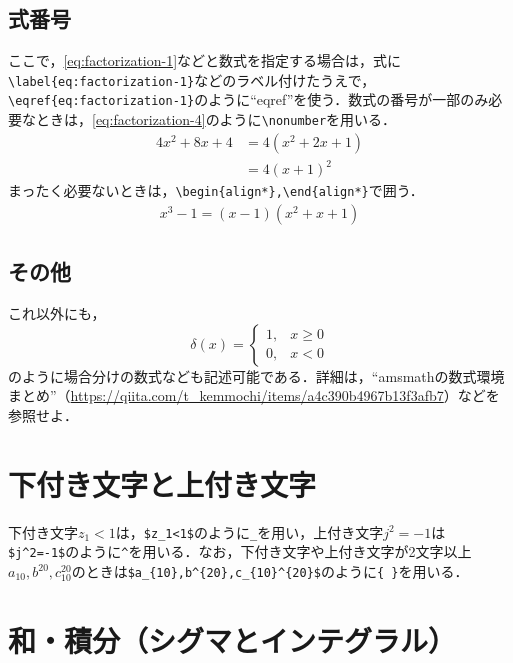 \documentclass[11pt,a4paper]{jsarticle}
\begin{document}
\subsection{式番号}

ここで，\eqref{eq:factorization-1}などと数式を指定する場合は，式に\verb|\label{eq:factorization-1}|などのラベル付けたうえで，\verb|\eqref{eq:factorization-1}|のように``eqref''を使う．数式の番号が一部のみ必要なときは，\eqref{eq:factorization-4}のように\verb|\nonumber|を用いる．
\begin{align}\label{eq:factorization-4}
  4x^2+8x+4 & =4\left(x^2+2x+1\right)\nonumber \\
            & =4(x+1)^2
\end{align}
まったく必要ないときは，\verb|\begin{align*},\end{align*}|で囲う．
\begin{align*}
  x^3-1=(x-1)\left(x^2+x+1\right)
\end{align*}

\subsection{その他}

これ以外にも，
\begin{equation*}
  \delta(x) =
  \begin{cases}
    1, & x \geq 0 \\
    0, & x < 0
  \end{cases}
\end{equation*}
のように場合分けの数式なども記述可能である．詳細は，``amsmathの数式環境まとめ''（\url{https://qiita.com/t_kemmochi/items/a4c390b4967b13f3afb7}）などを参照せよ．

\section{下付き文字と上付き文字}

下付き文字$z_1<1$は，\verb|$z_1<1$|のように\verb|_|を用い，上付き文字$j^2=-1$は\verb|$j^2=-1$|のように\verb|^|を用いる．なお，下付き文字や上付き文字が2文字以上$a_{10},b^{20},c_{10}^{20}$のときは\verb|$a_{10},b^{20},c_{10}^{20}$|のように\verb|{ }|を用いる．

\section{和・積分（シグマとインテグラル）}
\end{document}
